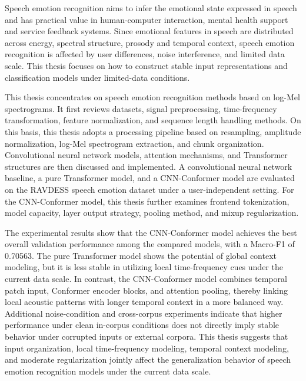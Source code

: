 \begin{abstractEn}
Speech emotion recognition aims to infer the emotional state expressed in speech and has practical value in human-computer interaction, mental health support and service feedback systems. Since emotional features in speech are distributed across energy, spectral structure, prosody and temporal context, speech emotion recognition is affected by user differences, noise interference, and limited data scale. This thesis focuses on how to construct stable input representations and classification models under limited-data conditions.

This thesis concentrates on speech emotion recognition methods based on log-Mel spectrograms. It first reviews datasets, signal preprocessing, time-frequency transformation, feature normalization, and sequence length handling methods. On this basis, this thesis adopts a processing pipeline based on resampling, amplitude normalization, log-Mel spectrogram extraction, and chunk organization. Convolutional neural network models, attention mechanisms, and Transformer structures are then discussed and implemented. A convolutional neural network baseline, a pure Transformer model, and a CNN-Conformer model are evaluated on the RAVDESS speech emotion dataset under a user-independent setting. For the CNN-Conformer model, this thesis further examines frontend tokenization, model capacity, layer output strategy, pooling method, and mixup regularization.

The experimental results show that the CNN-Conformer model achieves the best overall validation performance among the compared models, with a Macro-F1 of 0.70563. The pure Transformer model shows the potential of global context modeling, but it is less stable in utilizing local time-frequency cues under the current data scale. In contrast, the CNN-Conformer model combines temporal patch input, Conformer encoder blocks, and attention pooling, thereby linking local acoustic patterns with longer temporal context in a more balanced way. Additional noise-condition and cross-corpus experiments indicate that higher performance under clean in-corpus conditions does not directly imply stable behavior under corrupted inputs or external corpora. This thesis suggests that input organization, local time-frequency modeling, temporal context modeling, and moderate regularization jointly affect the generalization behavior of speech emotion recognition models under the current data scale.
\end{abstractEn}
